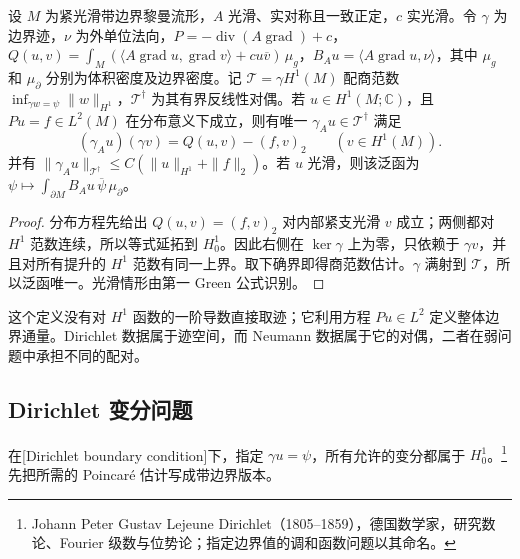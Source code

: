 \begin{proposition}\label{g3:prop:weak-conormal-trace}
	设 \(M\) 为紧光滑带边界黎曼流形，\(A\) 光滑、实对称且一致正定，\(c\) 实光滑。令 \(\gamma\) 为边界迹，\(\nu\) 为外单位法向，\(P=-\operatorname{div}(A\operatorname{grad})+c\)，\(Q(u,v)=\int_M(\langle A\operatorname{grad}u,\operatorname{grad}v\rangle+cu\overline v)\,\mu_g\)，\(B_Au=\langle A\operatorname{grad}u,\nu\rangle\)，其中 \(\mu_g\) 和 \(\mu_\partial\) 分别为体积密度及边界密度。记 \(\mathcal T=\gamma H^1(M)\) 配商范数 \(\inf_{\gamma w=\psi}\|w\|_{H^1}\)，\(\mathcal T^\dagger\) 为其有界反线性对偶。若 \(u\in H^1(M;\mathbb C)\)，且 \(Pu=f\in L^2(M)\) 在分布意义下成立，则有唯一 \(\gamma_Au\in\mathcal T^\dagger\) 满足
	\begin{equation}\label{g3:eq:weak-conormal-green}
		(\gamma_Au)(\gamma v)=Q(u,v)-(f,v)_2\qquad(v\in H^1(M)).
	\end{equation}
	并有 \(\|\gamma_Au\|_{\mathcal T^\dagger}\le C(\|u\|_{H^1}+\|f\|_2)\)。若 \(u\) 光滑，则该泛函为 \(\psi\mapsto\int_{\partial M}B_Au\,\overline\psi\,\mu_{\partial}\)。
\end{proposition}
\begin{proof}
	分布方程先给出 \(Q(u,v)=(f,v)_2\) 对内部紧支光滑 \(v\) 成立；两侧都对 \(H^1\) 范数连续，所以等式延拓到 \(H_0^1\)。因此右侧在 \(\ker\gamma\) 上为零，只依赖于 \(\gamma v\)，并且对所有提升的 \(H^1\) 范数有同一上界。取下确界即得商范数估计。\(\gamma\) 满射到 \(\mathcal T\)，所以泛函唯一。光滑情形由第一 Green 公式识别。
\end{proof}

这个定义没有对 \(H^1\) 函数的一阶导数直接取迹；它利用方程 \(Pu\in L^2\) 定义整体边界通量。Dirichlet 数据属于迹空间，而 Neumann 数据属于它的对偶，二者在弱问题中承担不同的配对。

\subsection{Dirichlet 变分问题}
\label{g3:subsec:1401:02}
在[Dirichlet boundary condition]下，指定 \(\gamma u=\psi\)，所有允许的变分都属于 \(H_0^1\)。\footnote{Johann Peter Gustav Lejeune Dirichlet（1805--1859），德国数学家，研究数论、Fourier 级数与位势论；指定边界值的调和函数问题以其命名。}先把所需的 Poincaré 估计写成带边界版本。

